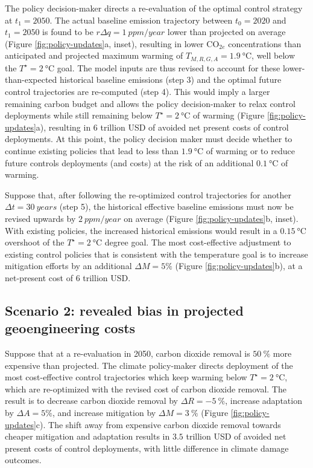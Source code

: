 \documentclass[9pt,twocolumn,twoside,lineno]{pnas-new}
\begin{document}
The policy decision-maker directs a re-evaluation of the optimal control strategy at $t_{1} = 2050$. The actual baseline emission trajectory between $t_{0}=2020$ and $t_{1}=2050$ is found to be $r\Delta q = \SI{1}{ppm/year}$ lower than projected on average (Figure \ref{fig:policy-updates}a, inset), resulting in lower CO$_{2e}$ concentrations than anticipated and projected maximum warming of $T_{M,R,G,A} = \SI{1.9}{\celsius}$, well below the $T^{\star} = \SI{2}{\celsius}$ goal. The model inputs are thus revised to account for these lower-than-expected historical baseline emissions (step 3) and the optimal future control trajectories are re-computed (step 4). This would imply a larger remaining carbon budget \citep{millar_cumulative_2016} and allows the policy decision-maker to relax control deployments while still remaining below $T^{\star} = \SI{2}{\celsius}$ of warming (Figure \ref{fig:policy-updates}a), resulting in $6$ trillion USD of avoided net present costs of control deployments. At this point, the policy decision maker must decide whether to continue existing policies that lead to less than $\SI{1.9}{\celsius}$ of warming or to reduce future controls deployments (and costs) at the risk of an additional $\SI{0.1}{\celsius}$ of warming.

Suppose that, after following the re-optimized control trajectories for another $\Delta t = \SI{30}{years}$ (step 5), the historical effective baseline emissions must now be revised upwards by $\SI{2}{ppm/year}$ on average (Figure \ref{fig:policy-updates}b, inset). With existing policies, the increased historical emissions would result in a $\SI{0.15}{\celsius}$ overshoot of the $T^{\star} = \SI{2}{\celsius}$ degree goal. The most cost-effective adjustment to existing control policies that is consistent with the temperature goal is to increase mitigation efforts by an additional $\Delta M = 5\%$ (Figure \ref{fig:policy-updates}b), at a net-present cost of $6$ trillion USD.

\subsection*{Scenario 2: revealed bias in projected geoengineering costs}

Suppose that at a re-evaluation in 2050, carbon dioxide removal is $\SI{50}{\%}$ more expensive than projected. The climate policy-maker directs deployment of the most cost-effective control trajectories which keep warming below $T^{\star}=\SI{2}{\celsius}$, which are re-optimized with the revised cost of carbon dioxide removal. The result is to decrease carbon dioxide removal by $\Delta R = \SI{-5}{\%}$, increase adaptation by $\Delta A = 5\%$, and increase mitigation by $\Delta M = \SI{3}{\%}$ (Figure \ref{fig:policy-updates}c). The shift away from expensive carbon dioxide removal towards cheaper mitigation and adaptation results in $3.5$ trillion USD of avoided net present costs of control deployments, with little difference in climate damage outcomes.
\end{document}
